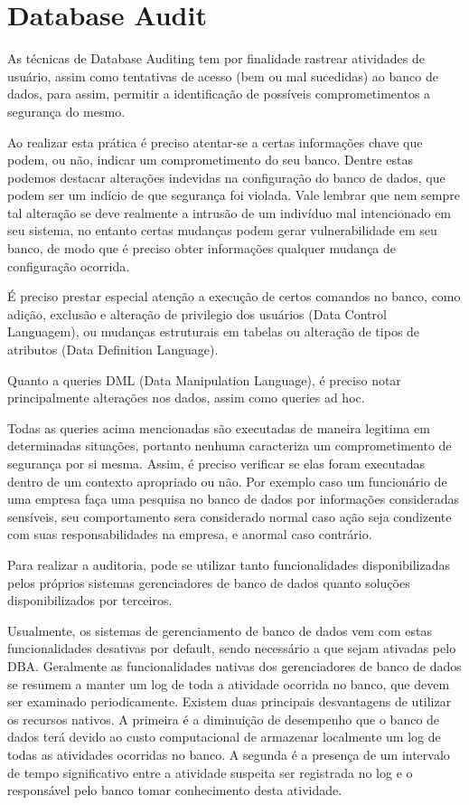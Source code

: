 ﻿\documentclass{article}
\begin{document}
\section{Database Audit}

As técnicas de Database Auditing tem por finalidade rastrear atividades de usuário, assim como tentativas de acesso (bem ou mal sucedidas) ao banco de dados, para assim, permitir a identificação de possíveis comprometimentos a segurança do mesmo.

Ao realizar esta prática é preciso atentar-se a certas informações chave que podem, ou não, indicar um comprometimento do seu banco. Dentre estas podemos destacar alterações indevidas na configuração do banco de dados, que podem ser um indício de que segurança foi violada. Vale lembrar que nem sempre tal alteração se deve realmente a intrusão de um indivíduo mal intencionado em seu sistema, no entanto certas mudanças podem gerar vulnerabilidade em seu banco, de modo que é preciso obter informações qualquer mudança de configuração ocorrida.

É preciso prestar especial atenção a execução de certos comandos no banco, como adição, exclusão e alteração de privilegio dos usuários (Data Control Languagem), ou  mudanças estruturais em tabelas ou alteração de tipos de atributos (Data Definition Language).

Quanto a queries DML (Data Manipulation Language), é preciso notar principalmente alterações nos dados, assim como queries ad hoc.

Todas as queries acima mencionadas são executadas de maneira legitima em determinadas situações, portanto nenhuma caracteriza um comprometimento de segurança por si mesma. Assim, é preciso verificar se elas foram executadas dentro de um contexto apropriado ou não. Por exemplo caso um funcionário de uma empresa faça uma pesquisa no banco de dados por informações consideradas sensíveis, seu comportamento sera considerado normal caso ação seja condizente com suas responsabilidades na empresa, e anormal caso contrário.

Para realizar a auditoria, pode se utilizar tanto funcionalidades disponibilizadas pelos próprios sistemas gerenciadores de banco de dados quanto soluções disponibilizados por terceiros.

Usualmente, os sistemas de gerenciamento de banco de dados vem com estas funcionalidades desativas por default, sendo necessário a que sejam ativadas pelo DBA. Geralmente as funcionalidades nativas dos gerenciadores de banco de dados se resumem a manter um log de toda a atividade ocorrida no banco, que devem ser examinado periodicamente. Existem duas principais desvantagens de utilizar os recursos nativos. A primeira é a diminuição de desempenho que o banco de dados terá devido ao custo computacional de armazenar localmente um log de todas as atividades ocorridas no banco. A segunda é a presença de um intervalo de tempo significativo entre a atividade suspeita ser registrada no log e o responsável pelo banco tomar conhecimento desta atividade. 
\end{document}

